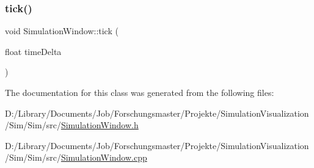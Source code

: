 \mbox{\label{class_simulation_window_a7cde85cc846dceb4cbb9913f861b495a}} 
\subsubsection{\texorpdfstring{tick()}{tick()}}
{\footnotesize\ttfamily void Simulation\+Window\+::tick (\begin{DoxyParamCaption}\item[{float}]{time\+Delta }\end{DoxyParamCaption})\hspace{0.3cm}{\ttfamily [override]}}



The documentation for this class was generated from the following files\+:\begin{DoxyCompactItemize}
\item 
D\+:/\+Library/\+Documents/\+Job/\+Forschungsmaster/\+Projekte/\+Simulation\+Visualization/\+Sim/\+Sim/src/\mbox{\hyperlink{_simulation_window_8h}{Simulation\+Window.\+h}}\item 
D\+:/\+Library/\+Documents/\+Job/\+Forschungsmaster/\+Projekte/\+Simulation\+Visualization/\+Sim/\+Sim/src/\mbox{\hyperlink{_simulation_window_8cpp}{Simulation\+Window.\+cpp}}\end{DoxyCompactItemize}
